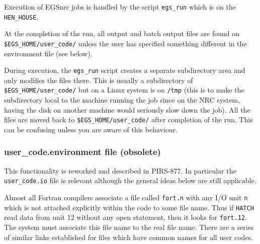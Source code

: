 Execution of EGSnrc jobs is handled by the script {\tt egs\_run}
which is on the {\tt HEN\_HOUSE}.

At the completion of the run, all output and batch output files are 
found on\\
\verb+$EGS_HOME/user_code/+ unless the user has specified something
different in the environment file (see below).

During execution, the {\tt egs\_run} script creates a separate subdirectory area
and only modifies the files there. This is usually a subdirectory of 
\verb+$EGS_HOME/user_code/+ but on a Linux system is on {\tt /tmp} 
(this is to
make the subdirectory local to the machine running the job since on the NRC
system, having the disk on another machine would seriously slow down the
job). All
the files are moved back to \verb+$EGS_HOME/user_code/+ after
completion of the run.  This can be confusing unless you are aware of this
behaviour.

\subsubsection{user\_code.environment file (obsolete)}

This functionality is reworked and described in PIRS-877\cite{Ka03}.  In
particular the {\tt user\_code.io} file is relevant although the general
ideas below are still applicable.

% 
Almost all Fortran compilers associate a file called {\tt fort.n} with any I/O
unit {\tt n} which is not attached explicitly within the code to some 
file name. Thus if {\tt HATCH} read data from unit 12 without any open
statement, then it looks for {\tt fort.12}.  The system must associate
this file name to the real file name.  
There are a series of similar links established
for files which have common names for all user codes.

% 
% 




